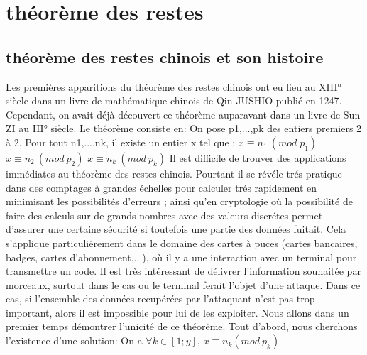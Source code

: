 \documentclass[a4paper, 11pt]{report}
\begin{document}
\chapter{théorème des restes}
\section{théorème des restes chinois et son histoire}
Les premières apparitions du théorème des restes chinois ont eu lieu au XIII° siècle  dans un livre de mathématique chinois de Qin JUSHIO publié en 1247. Cependant, on avait déjà découvert ce théorème auparavant dans un livre de Sun ZI au III° siècle. Le théorème consiste en:
On pose p1,...,pk des entiers premiers 2 à 2. Pour tout n1,...,nk, il existe un entier x tel que :
\newline
\newline
$ x\equiv n_1 \: (mod \;  p_1)$ 
\newline
$ x\equiv n_2 \: (mod \: p_2)$
\newline
$ x \equiv n_k \:(mod\: p_k)$
\newline
\newline
Il est difficile de trouver des applications immédiates au théorème des restes chinois. 
Pourtant il se révéle trés pratique dans des comptages à grandes échelles pour calculer trés rapidement 
en minimisant les possibilités d'erreurs ;
ainsi qu'en cryptologie où la possibilité de faire des calculs sur de grands nombres avec des valeurs discrétes permet d'assurer une certaine sécurité si toutefois une partie des données fuitait.
Cela s'applique particuliérement dans le domaine des cartes à puces (cartes bancaires, badges, cartes d'abonnement,...), où il y a une interaction avec un terminal pour transmettre un code.
Il est très intéressant de délivrer l'information souhaitée par morceaux, surtout dans le cas ou le terminal ferait l'objet d'une attaque.
Dans ce cas, si l'ensemble des données recupérées par l'attaquant n'est pas trop important, alors il est impossible pour lui de les exploiter.
\newline
\newline
\newline
\newline
Nous allons dans un premier temps démontrer l'unicité de ce théorème.
\newline
Tout d'abord, nous cherchons l'existence d'une solution: \newline
On a $\forall k \in [1;y]  $, $x\equiv n_k (mod \: p_k)$ \newline
\end{document}

